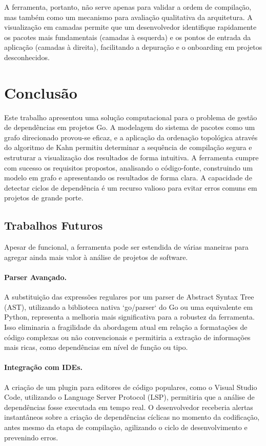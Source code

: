 \documentclass[12pt]{article}
\begin{document}
A ferramenta, portanto, não serve apenas para validar a ordem de compilação, mas também como um mecanismo para avaliação qualitativa da arquitetura. A visualização em camadas permite que um desenvolvedor identifique rapidamente os pacotes mais fundamentais (camadas à esquerda) e os pontos de entrada da aplicação (camadas à direita), facilitando a depuração e o onboarding em projetos desconhecidos.

\section{Conclusão}
Este trabalho apresentou uma solução computacional para o problema de gestão de dependências em projetos Go. A modelagem do sistema de pacotes como um grafo direcionado provou-se eficaz, e a aplicação da ordenação topológica através do algoritmo de Kahn \cite{kahn1962} permitiu determinar a sequência de compilação segura e estruturar a visualização dos resultados de forma intuitiva. A ferramenta cumpre com sucesso os requisitos propostos, analisando o código-fonte, construindo um modelo em grafo e apresentando os resultados de forma clara. A capacidade de detectar ciclos de dependência é um recurso valioso para evitar erros comuns em projetos de grande porte.

\subsection{Trabalhos Futuros}
Apesar de funcional, a ferramenta pode ser estendida de várias maneiras para agregar ainda mais valor à análise de projetos de software.

\paragraph{Parser Avançado.} A substituição das expressões regulares por um parser de Abstract Syntax Tree (AST), utilizando a biblioteca nativa `go/parser` do Go ou uma equivalente em Python, representa a melhoria mais significativa para a robustez da ferramenta. Isso eliminaria a fragilidade da abordagem atual em relação a formatações de código complexas ou não convencionais e permitiria a extração de informações mais ricas, como dependências em nível de função ou tipo.

\paragraph{Integração com IDEs.} A criação de um plugin para editores de código populares, como o Visual Studio Code, utilizando o Language Server Protocol (LSP), permitiria que a análise de dependências fosse executada em tempo real. O desenvolvedor receberia alertas instantâneos sobre a criação de dependências cíclicas no momento da codificação, antes mesmo da etapa de compilação, agilizando o ciclo de desenvolvimento e prevenindo erros.
\end{document}
